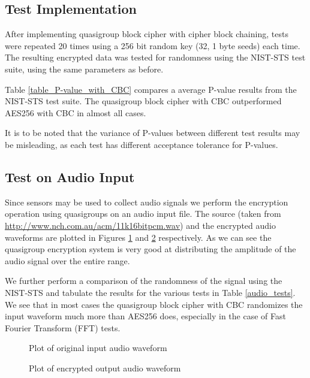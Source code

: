 \documentclass[conference]{IEEEtran}
\begin{document}
\subsection{Test Implementation}
After implementing quasigroup block cipher with cipher block chaining, tests were repeated 20 times using a 256 bit random key (32, 1 byte seeds) each time. The resulting encrypted data was tested for randomness using the NIST-STS test suite, using the same parameters as before.

Table \ref{table_P-value_with_CBC} compares a average P-value results from the NIST-STS test suite. The quasigroup block cipher with CBC outperformed AES256 with CBC in almost all cases.

It is to be noted that the variance of P-values between different test results may be misleading, as each test has different acceptance tolerance for P-values.

\subsection{Test on Audio Input}
Since sensors may be used to collect audio signals we perform the encryption operation using quasigroups on an audio input file. The source (taken from \url{http://www.nch.com.au/acm/11k16bitpcm.wav}) and the encrypted audio waveforms are plotted in Figures \ref{fig:audioWaves} and \ref{fig:audioEnc} respectively. As we can see the quasigroup encryption system is very good at distributing the amplitude of the audio signal over the entire range.

We further perform a comparison of the randomness of the signal using the NIST-STS and tabulate the results for the various tests in Table \ref{audio_tests}. We see that in most cases the quasigroup block cipher with CBC randomizes the input waveform much more than AES256 does, especially in the case of Fast Fourier Transform (FFT) tests.

\begin{figure}[!ht]
\centering
{}
\caption{Plot of original input audio waveform}
\label{fig:audioWaves}
\end{figure}

\begin{figure}[!ht]
\centering
{}
\caption{Plot of encrypted output audio waveform}
\label{fig:audioEnc}
\end{figure}
\end{document}
